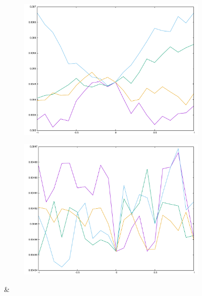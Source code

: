 {\begin{figure}[H]
\begin{subfigure}{.33\textwidth}
	\includegraphics[width=\linewidth]{fig/ajherr/t3rr/L_chi.pdf}
\end{subfigure}%
\begin{subfigure}{.33\textwidth}
	\includegraphics[width=\linewidth]{fig/ajherr/t3rr/M_chi.pdf}
\end{subfigure}&
\begin{subfigure}{.33\textwidth}

\end{subfigure}
\end{figure}}
